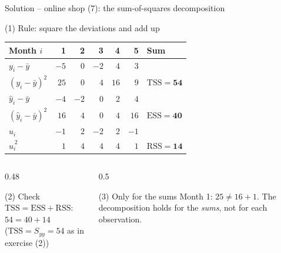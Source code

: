 \documentclass[aspectratio=169,11pt]{beamer}
\begin{document}
\begin{frame}{Solution -- online shop (7): the sum-of-squares decomposition}
  \begin{block}{(1) Rule: square the deviations and add up}
    \begin{center}
      \footnotesize
      \renewcommand{\arraystretch}{0.95}
      \begin{tabular}{lrrrrrl}
        \toprule
        Month $i$                                                & 1    & 2    & 3    & 4    & 5    & Sum \\
        \midrule
        $y_i - \bar{y}$                                          & $-5$ & $0$  & $-2$ & $4$  & $3$  & \\
        {\color{hsbigruen}$(y_i - \bar{y})^{2}$}                 & $25$ & $0$  & $4$  & $16$ & $9$  & $\text{TSS} = \mathbf{54}$ \\
        \midrule
        $\hat{y}_i - \bar{y}$                                    & $-4$ & $-2$ & $0$  & $2$  & $4$  & \\
        {\color{hsbiorange!85!black}$(\hat{y}_i - \bar{y})^{2}$} & $16$ & $4$  & $0$  & $4$  & $16$ & $\text{ESS} = \mathbf{40}$ \\
        \midrule
        $\hat{u}_i$                                              & $-1$ & $2$  & $-2$ & $2$  & $-1$ & \\
        {\color{hsbirot}$\hat{u}_i^{\,2}$}                       & $1$  & $4$  & $4$  & $4$  & $1$  & $\text{RSS} = \mathbf{14}$ \\
        \bottomrule
      \end{tabular}
    \end{center}
  \end{block}

  \begin{columns}[T]
    \begin{column}{0.48\textwidth}
      \begin{exampleblock}{(2) Check}
        $\text{TSS} = \text{ESS} + \text{RSS}$: \ $54 = 40 + 14$ \checkmark\\
        ($\text{TSS} = S_{yy} = 54$ as in exercise (2))
      \end{exampleblock}
    \end{column}
    \begin{column}{0.5\textwidth}
      \begin{alertblock}{(3) Only for the sums}
        Month 1: $25 \ne 16 + 1$. The decomposition holds for the
        \emph{sums}, not for each observation.
      \end{alertblock}
    \end{column}
  \end{columns}
\end{frame}
\end{document}
